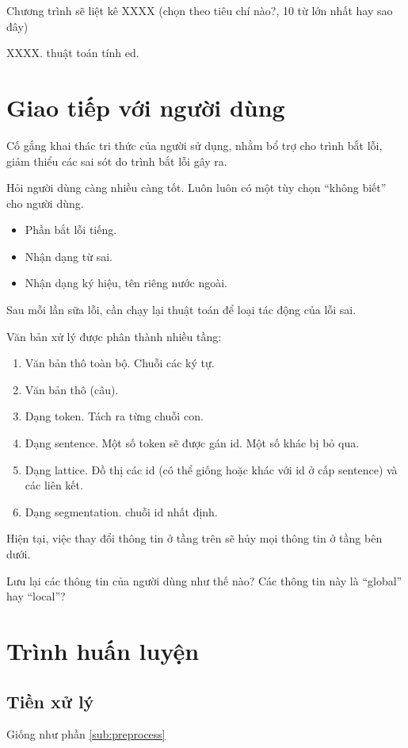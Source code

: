 \documentclass[a4paper,oneside]{book} %
\begin{document}
Chương trình sẽ liệt kê XXXX (chọn theo tiêu chí nào?, 10 từ lớn nhất
hay sao đây)

XXXX. thuật toán tính ed.

\section{Giao tiếp với người dùng}
\label{sec:ui}

Cố gắng khai thác tri thức của người sử dụng, nhằm bổ trợ cho trình
bắt lỗi, giảm thiểu các sai sót do trình bắt lỗi gây ra.

Hỏi người dùng càng nhiều càng tốt. Luôn luôn có một tùy chọn ``không
biết'' cho người dùng.

\begin{itemize}
\item Phần bắt lỗi tiếng.
\item Nhận dạng từ sai.
\item Nhận dạng ký hiệu, tên riêng nước ngoài.
\end{itemize}

Sau mỗi lần sữa lỗi, cần chạy lại thuật toán để loại tác động của lỗi
sai.

Văn bản xử lý được phân thành nhiều tầng:
\begin{enumerate}
\item Văn bản thô toàn bộ. Chuỗi các ký tự.
\item Văn bản thô (câu).
\item Dạng token. Tách ra từng chuỗi con.
\item Dạng sentence. Một số token sẽ được gán id. Một số khác bị bỏ
  qua. 
\item Dạng lattice. Đồ thị các id (có thể giống hoặc khác với id ở cấp
  sentence) và các liên kết. 
\item Dạng segmentation. chuỗi id nhất định.
\end{enumerate}

Hiện tại, việc thay đổi thông tin ở tầng trên sẽ hủy mọi thông tin ở
tầng bên dưới.

Lưu lại các thông tin của người dùng như thế nào? Các thông tin này là
``global'' hay ``local''?

\section{Trình huấn luyện}
\label{sec:training}

\subsection{Tiền xử lý}
Giống như phần \ref{sub:preprocess}
\end{document}
